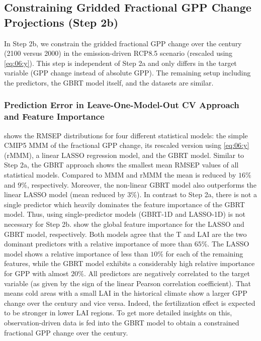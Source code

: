 \subsection{Constraining Gridded Fractional \acs{GPP} Change Projections (Step
  2b)}
\label{subsec:06:results_step2b}

In Step 2b, we constrain the gridded fractional \ac{GPP} change over the
 century (2100 versus 2000) in the emission-driven \acs{RCP}8.5
scenario (rescaled using \cref{eq:06:y}). This step is independent of Step 2a
and only differs in the target variable (\ac{GPP} change instead of absolute
\ac{GPP}). The remaining setup including the predictors, the \ac{GBRT} model
itself, and the datasets are similar.


\subsubsection{Prediction Error in Leave-One-Model-Out \acs{CV} Approach and
  Feature Importance}
\label{subsubsec:06:results_step2b_ml_inference}

 shows the \ac{RMSEP} distributions for four
different statistical models: the simple \acs{CMIP}5 \ac{MMM} of the fractional
\ac{GPP} change, its rescaled version using \cref{eq:06:y} (r\acs{MMM}), a
linear \ac{LASSO} regression model, and the \ac{GBRT} model. Similar to Step
2a, the \ac{GBRT} approach shows the smallest mean \ac{RMSEP} values of all
statistical models. Compared to \ac{MMM} and r\acs{MMM} the mean is reduced by
$16 \unit{\%}$ and $9 \unit{\%}$, respectively. Moreover, the non-linear
\ac{GBRT} model also outperforms the linear \ac{LASSO} model (mean reduced by
$3 \unit{\%}$). In contrast to Step 2a, there is not a single predictor which
heavily dominates the feature importance of the \ac{GBRT} model. Thus, using
single-predictor models (\acs{GBRT}-1D and \acs{LASSO}-1D) is not necessary for
Step 2b.  show
the global feature importance for the \ac{LASSO} and \ac{GBRT} model,
respectively. Both models agree that the \acf{T} and \ac{LAI} are the two
dominant predictors with a relative importance of more than $65 \unit{\%}$. The
\ac{LASSO} model shows a relative importance of less than $10 \unit{\%}$ for
each of the remaining features, while the \ac{GBRT} model exhibits a
considerably high relative importance for \ac{GPP} with almost $20 \unit{\%}$.
All predictors are negatively correlated to the target variable (as given by
the sign of the linear Pearson correlation coefficient). That means cold areas
with a small \ac{LAI} in the historical climate show a larger \ac{GPP} change
over the  century and vice versa. Indeed, the fertilization effect is
expected to be stronger in lower \ac{LAI} regions. To get more detailed
insights on this, observation-driven data is fed into the \ac{GBRT} model to
obtain a constrained fractional \ac{GPP} change over the  century.

